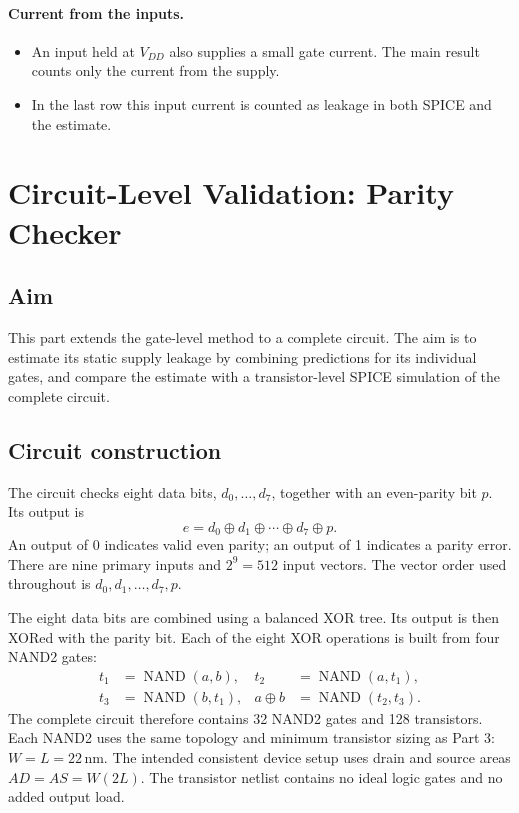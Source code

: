 \documentclass{article}
\begin{document}
\paragraph{Current from the inputs.}
\begin{itemize}
    \item An input held at $V_{DD}$ also supplies a small gate current. The
          main result counts only the current from the supply.
    \item In the last row this input current is counted as leakage in both
          SPICE and the estimate.
\end{itemize}

\clearpage
\section{Circuit-Level Validation: Parity Checker}
\label{sec:circuit}

\subsection{Aim}
This part extends the gate-level method to a complete circuit. The aim is
to estimate its static supply leakage by combining predictions for its
individual gates, and compare the estimate with a transistor-level SPICE
simulation of the complete circuit.

\subsection{Circuit construction}
The circuit checks eight data bits, $d_0,\ldots,d_7$, together with an
even-parity bit $p$. Its output is
\begin{equation}
e=d_0\oplus d_1\oplus\cdots\oplus d_7\oplus p.
\end{equation}
An output of 0 indicates valid even parity; an output of 1 indicates a
parity error. There are nine primary inputs and $2^9=512$ input vectors.
The vector order used throughout is $d_0,d_1,\ldots,d_7,p$.

The eight data bits are combined using a balanced XOR tree. Its output is
then XORed with the parity bit. Each of the eight XOR operations is built
from four NAND2 gates:
\begin{align}
t_1&=\operatorname{NAND}(a,b), &
t_2&=\operatorname{NAND}(a,t_1),\\
t_3&=\operatorname{NAND}(b,t_1), &
a\oplus b&=\operatorname{NAND}(t_2,t_3).
\end{align}
The complete circuit therefore contains 32 NAND2 gates and 128 transistors.
Each NAND2 uses the same topology and minimum transistor sizing as Part 3:
$W=L=22$\,nm. The intended consistent device setup uses drain and source
areas $AD=AS=W(2L)$. The transistor netlist contains no ideal logic gates
and no added output load.
\end{document}
